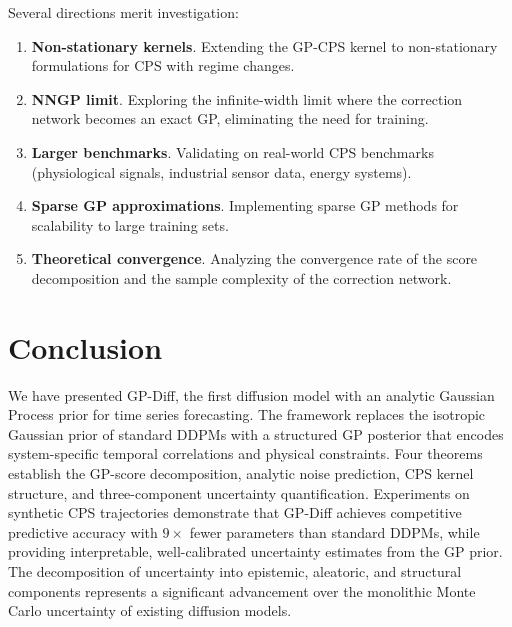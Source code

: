 \documentclass[conference]{IEEEtran}
\begin{document}
Several directions merit investigation:
\begin{enumerate}
    \item \textbf{Non-stationary kernels}. Extending the GP-CPS kernel to non-stationary formulations for CPS with regime changes.
    \item \textbf{NNGP limit}. Exploring the infinite-width limit where the correction network becomes an exact GP, eliminating the need for training.
    \item \textbf{Larger benchmarks}. Validating on real-world CPS benchmarks (physiological signals, industrial sensor data, energy systems).
    \item \textbf{Sparse GP approximations}. Implementing sparse GP methods for scalability to large training sets.
    \item \textbf{Theoretical convergence}. Analyzing the convergence rate of the score decomposition and the sample complexity of the correction network.
\end{enumerate}

\section{Conclusion}

We have presented GP-Diff, the first diffusion model with an analytic Gaussian Process prior for time series forecasting. The framework replaces the isotropic Gaussian prior of standard DDPMs with a structured GP posterior that encodes system-specific temporal correlations and physical constraints. Four theorems establish the GP-score decomposition, analytic noise prediction, CPS kernel structure, and three-component uncertainty quantification. Experiments on synthetic CPS trajectories demonstrate that GP-Diff achieves competitive predictive accuracy with $9\times$ fewer parameters than standard DDPMs, while providing interpretable, well-calibrated uncertainty estimates from the GP prior. The decomposition of uncertainty into epistemic, aleatoric, and structural components represents a significant advancement over the monolithic Monte Carlo uncertainty of existing diffusion models.
\end{document}
